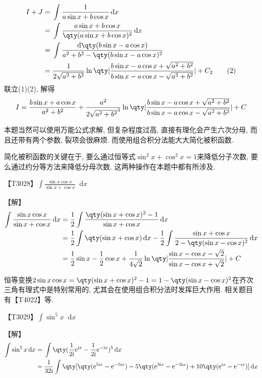 \documentclass{ctexbook}
\newcommand{\e}{\mathrm{e}}
\newcommand{\im}{\mathrm{i}}
\newcommand*{\dif}{\mathop{}\!\mathrm{d}}
\begin{document}
{\begin{align*}
I+J={}&\int\frac{1}{a\sin{x}+b\cos{x}}\dif{x}\\
={}&\int\frac{a\sin{x}+b\cos{x}}{\qty(a\sin{x}+b\cos{x})^{2}}\dif{x}\\
={}&\int\frac{\dif{\qty(b\sin{x}-a\cos{x})}}{a^{2}+b^{2}-\qty(b\sin{x}-a\cos{x})^{2}}\\
={}&\frac{1}{2\sqrt{a^{2}+b^{2}}}\ln\qty|\frac{b\sin{x}-a\cos{x}+\sqrt{a^{2}+b^{2}}}{b\sin{x}-a\cos{x}-\sqrt{a^{2}+b^{2}}}|+C_{2}\tag{2}
\end{align*}
联立(1)(2), 解得
\begin{align*}
I=\frac{b\sin{x}+a\cos{x}}{a^{2}+b^{2}}+\frac{a^{2}}{2\sqrt{a^{2}+b^{2}}^{3}}\ln\qty|\frac{b\sin{x}-a\cos{x}+\sqrt{a^{2}+b^{2}}}{b\sin{x}-a\cos{x}-\sqrt{a^{2}+b^{2}}}|+C
\end{align*}\par
{\kaishu 本题当然可以使用万能公式求解, 但复杂程度过高, 直接有理化会产生六次分母, 而且还带有两个参数, 裂项会很麻烦. 而使用组合积分法能大大简化被积函数. \par
简化被积函数的关键在于, 要么通过恒等式$\sin^{2}{x}+\cos^{2}{x}=1$来降低分子次数, 要么通过约分等方法来降低分母次数. 这两种操作在本题中都有所涉及. \par}
{\color{red}【T3028】}$\int\frac{\sin{x}\cos{x}}{\sin{x}+\cos{x}}\dif{x}$\par
【解】
\begin{align*}
\int\frac{\sin{x}\cos{x}}{\sin{x}+\cos{x}}\dif{x}={}&\frac{1}{2}\int\frac{\qty(\sin{x}+\cos{x})^{2}-1}{\sin{x}+\cos{x}}\dif{x}\\
={}&\frac{1}{2}\int\qty(\sin{x}+\cos{x})\dif{x}-\frac{1}{2}\int\frac{\sin{x}+\cos{x}}{2-\qty(\sin{x}-\cos{x})^{2}}\dif{x}\\
={}&\frac{1}{2}\sin{x}-\frac{1}{2}\cos{x}+\frac{1}{4\sqrt{2}}\ln\qty|\frac{\sin{x}-\cos{x}-\sqrt{2}}{\sin{x}-\cos{x}+\sqrt{2}}|+C
\end{align*}\par
{\kaishu 恒等变换$2\sin{x}\cos{x}=\qty(\sin{x}+\cos{x})^{2}-1=1-\qty(\sin{x}-\cos{x})^{2}$在齐次三角有理式中是特别常用的, 尤其会在使用组合积分法时发挥巨大作用. 相关题目有【T4022】等. \par}
{\color{red}【T3029】}$\int\sin^{5}{x}\dif{x}$\par
【解】
\begin{align*}
\int\sin^{5}{x}\dif{x}={}&\int\qty(\frac{1}{2\im}\e^{\im x}-\frac{1}{2\im}\e^{-\im x})^{5}\dif{x}\\
={}&\frac{1}{32\im}\int\qty[\qty(\e^{5\im x}-\e^{-5\im x})-5\qty(\e^{3\im x}-\e^{-3\im x})+10\qty(\e^{\im x}-\e^{-\im x})]\dif{x}\\

\end{align*}}
\end{document}

